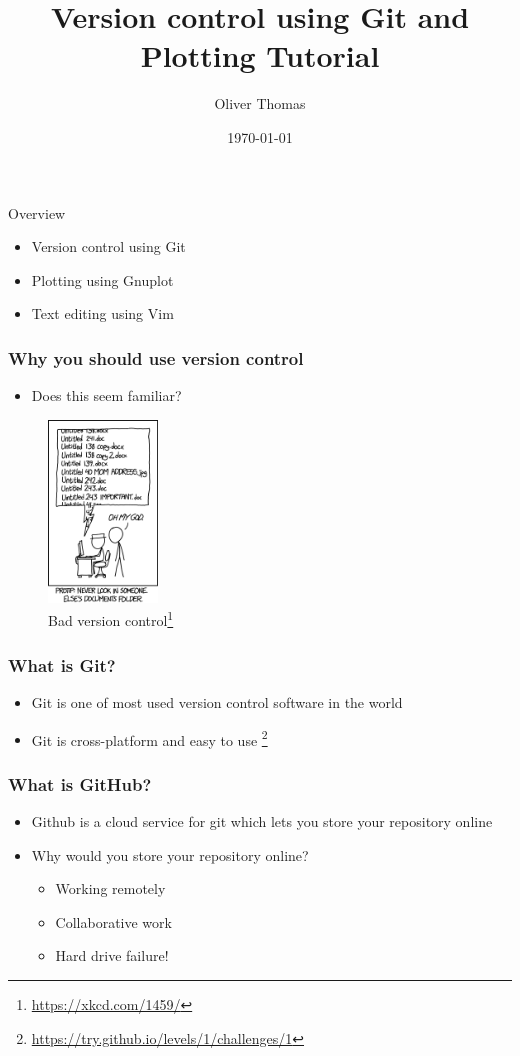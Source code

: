 \documentclass{beamer}
\title{Version control using Git and Plotting Tutorial}
\author{Oliver Thomas}
\institute{Quantum Engineering CDT \\ University of Bristol}
\date{\today}
\begin{document}
\frame{\titlepage}



\begin{frame}{Overview}


\begin{itemize}
        \item Version control using Git
        \item Plotting using Gnuplot
        \item Text editing using Vim
    \end{itemize}
\end{frame}

\begin{frame}
\frametitle{Why you should use version control}
\begin{itemize}
	\item Does this seem familiar? 
\end{itemize}

\begin{figure}[H]
	\centering
	\includegraphics[width=0.26\textwidth]{xkcdversion.png}
	\caption{Bad version control\footnote{\url{https://xkcd.com/1459/}}}
	\label{fig:xkcdversion}
\end{figure}
\end{frame}

\begin{frame}
\frametitle{What is Git?}
\begin{itemize}
\item Git is one of most used version control software in the world 
\item Git is cross-platform and easy to use \footnote{\url{https://try.github.io/levels/1/challenges/1}}
\end{itemize}
\end{frame}

\begin{frame}
\frametitle{What is GitHub?}
\begin{itemize} 
\item Github is a cloud service for git which lets you store your repository online
\item Why would you store your repository online?
\begin{itemize}
\item Working remotely
\item Collaborative work  
\item Hard drive failure!
\end{itemize}
\end{itemize}
\end{frame}
\end{document}

